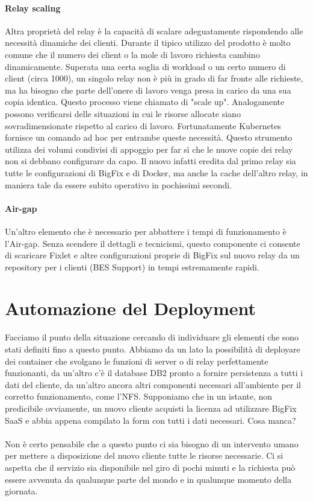 \paragraph{Relay scaling}
Altra proprietà del relay è la capacità di scalare adeguatamente rispondendo alle necessità dinamiche dei clienti. Durante il tipico utilizzo del prodotto è molto comune che il numero dei client o la mole di lavoro richiesta cambino dinamicamente. Superata una certa soglia di workload o un certo numero di client (circa 1000), un singolo relay non è più in grado di far fronte alle richieste, ma ha bisogno che parte dell'onere di lavoro venga presa in carico da una sua copia identica. Questo processo viene chiamato di "scale up". Analogamente possono verificarsi delle situazioni in cui le risorse allocate siano sovradimensionate rispetto al carico di lavoro. Fortunatamente Kubernetes fornisce un comando ad hoc per entrambe queste necessità. Questo strumento utilizza dei volumi condivisi di appoggio per far sì che le nuove copie dei relay non si debbano configurare da capo. Il nuovo infatti eredita dal primo relay sia tutte le configurazioni di BigFix e di Docker, ma anche la cache dell'altro relay, in maniera tale da essere subito operativo in pochissimi secondi. 
\paragraph{Air-gap}
Un'altro elemento che è necessario per abbattere i tempi di funzionamento è l'Air-gap. Senza scendere il dettagli e tecnicismi, questo componente ci consente di scaricare Fixlet e altre configurazioni proprie di BigFix sul nuovo relay da un repository per i clienti (BES Support) in tempi estremamente rapidi. 
\section{Automazione del Deployment}
Facciamo il punto della situazione cercando di individuare gli elementi che sono stati definiti fino a questo punto. Abbiamo da un lato la possibilità di deployare dei container che svolgano le funzioni di server o di relay perfettamente funzionanti, da un'altro c'è il database DB2 pronto a fornire persistenza a tutti i dati del cliente, da un'altro ancora altri componenti necessari all'ambiente per il corretto funzionamento, come l'NFS. Supponiamo che in un istante, non predicibile ovviamente, un nuovo cliente acquisti la licenza ad utilizzare BigFix SaaS e abbia appena compilato la form con tutti i dati necessari. Cosa manca? 
\paragraph{}
Non è certo pensabile che a questo punto ci sia bisogno di un intervento umano per mettere a disposizione del nuovo cliente tutte le risorse necessarie. Ci si aspetta che il servizio sia disponibile nel giro di pochi minuti e la richiesta può essere avvenuta da qualunque parte del mondo e in qualunque momento della giornata.

